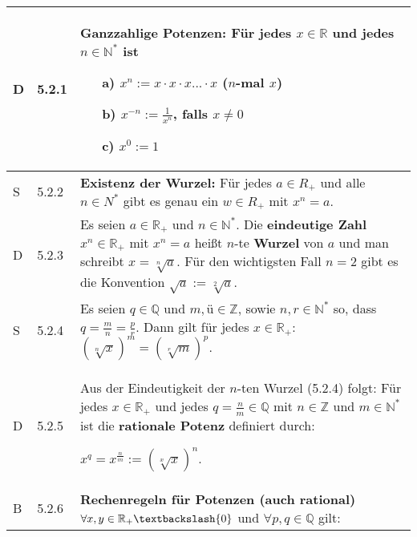     \begin{longtable}{p{0.75cm} p{1cm} p{16cm}}
        \toprule
        
        D   & 5.2.1 &   \textbf{Ganzzahlige Potenzen:} \hfill \break
                        Für jedes $x\in \mathbb{R}$ und jedes $n \in \mathbb{N^*}$ ist
                        \begin{itemize}[topsep=-0.5cm]
                            \item[a)] $x^n := x \cdot x \cdot x ... \cdot x$ ($n$-mal $x$)
                            \item[b)] $x^{-n} := \frac{1}{x^n}$, falls $x\neq 0$
                            \item[c)] $x^0 := 1$  
                        \end{itemize} \vspace{-0cm} \\
        \midrule
        S   & 5.2.2 &   \textbf{Existenz der Wurzel:} \hfill \break 
                        Für jedes $a \in R_+$ und alle $n \in N^*$ gibt es genau ein $w \in R_+$ mit $x^n = a$. \\
        \midrule
        D   & 5.2.3 &   Es seien $a \in \mathbb{R_+}$ und $n \in \mathbb{N^*}$. Die \textbf{eindeutige Zahl} $x^n \in \mathbb{R_+}$ mit 
                        $x^n = a$ heißt $n$-te \textbf{Wurzel} von $a$ und man schreibt $x = \sqrt[n]{a}$. Für den wichtigsten Fall $n = 2$ 
                        gibt es die Konvention $\sqrt{a} := \sqrt[2]{a}$. \\
        \midrule
        S   & 5.2.4 &   Es seien $q \in \mathbb{Q}$ und $m,ü \in \mathbb{Z}$, sowie $n,r \in \mathbb{N^*}$ so, dass
                        $q = \frac{m}{n} = \frac{p}{r}$. \hfill \break
                        Dann gilt für jedes $x \in \mathbb{R_+}$: $(\sqrt[n]{x})^m = (\sqrt[r]{m})^p$. \\
        \midrule
        D   & 5.2.5 &   Aus der Eindeutigkeit der $n$-ten Wurzel (5.2.4) folgt: \hfill \break
                        Für jedes $x \in \mathbb{R_+}$ und jedes $q = \frac{n}{m} \in \mathbb{Q}$ mit $n \in \mathbb{Z}$ und 
                        $m \in \mathbb{N^*}$ ist die \textbf{rationale Potenz} definiert durch: \hfill \break
                        \centerline{$x^q = x^{\frac{n}{m}} := (\sqrt[x]{x})^n$.} \\
        \midrule
        B   & 5.2.6 &   \textbf{Rechenregeln für Potenzen (auch rational)} \hfill \break
                        $\forall x,y \in \mathbb{R_+} \textbackslash \{0\}$ und $\forall p,q \in \mathbb{Q}$ gilt: 

\end{longtable}
